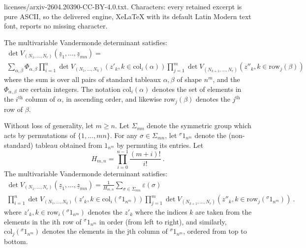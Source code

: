 \documentclass[10pt,a4paper]{amsart}
\newcommand{\z}{\underline{z}}
\begin{document}
licenses/arxiv-2604.20390-CC-BY-4.0.txt. Characters: every retained excerpt is pure ASCII, so the delivered engine, XeLaTeX with its default Latin Modern text font, reports no missing character.
\begin{thm} \label{thm: FirstVDMformula} The multivariable Vandermonde determinant satisfies:
\begin{multline}  \det V_{(N_1,\ldots, N_r)} (\z_1,\ldots , \z_{mn}) =   \label{Intro:FirstVDMformula} \\
 \sum_{\alpha,\beta}  \Phi_{\alpha,\beta} \prod_{i=1}^n  \det V_{(N_1,\ldots, N_k)} (z'_k, k\in \mathrm{col}_i(\alpha))  \prod_{j=1}^m  \det V_{(N_{k+1},\ldots, N_r)} (z''_k, k\in \mathrm{row}_j(\beta))   \end{multline}
 where the sum is over all pairs of standard tableaux $\alpha,\beta$ of shape $n^m$, and the $\Phi_{\alpha,\beta}$ are certain integers. The notation $\mathrm{col}_i(\alpha)$ denotes the set of elements in the $i^{\mathrm{th}}$ column of $\alpha$, in ascending order, and likewise $\mathrm{row}_j(\beta)$ denotes the $j^{\mathrm{th}}$ row of $\beta$.
 \end{thm} 

\begin{thm} \label{thm: SecondFormula} Without loss of generality, let $m\geq n$. Let $\Sigma_{mn}$ denote the symmetric group which acts by permutations of $\{1,\ldots, mn\}$.  For any $\sigma \in \Sigma_{mn}$,  let ${}^\sigma1_{n^m}$ denote the (non-standard) tableau obtained from $1_{n^m}$ by permuting its entries. Let 
\[ H_{m,n} =  \prod_{i=0}^{n-1}  \frac{(m+i)!}{i!}  \ .\]
The  multivariable Vandermonde determinant satisfies:
\begin{multline}  \det V_{(N_1,\ldots, N_r)} (\z_1,\ldots , \z_{mn}) =  \frac{1}{H_{m,n}}  \sum_{\sigma \in \Sigma_{mn}}  \varepsilon(\sigma)    \label{Intro:SecondVDMformula} \\
  \prod_{i=1}^n  \det V_{(N_1,\ldots, N_k)} (z'_k, k\in \mathrm{col}_i({}^\sigma1_{n^m}) )  \prod_{j=1}^m  \det V_{(N_{k+1},\ldots, N_r)} (z''_k, k\in \mathrm{row}_j({}^\sigma1_{n^m}))     \ . \end{multline}
  where $z'_k, k\in \mathrm{row}_i({}^\sigma1_{n^m}) $ denotes the $z'_k$ where the indices $k$ are taken from the elements in the ith row of ${}^\sigma1_{n^m}$ in  order (from left to right), and similarly, $\mathrm{col}_j({}^\sigma1_{n^m})$ denotes the elements in the jth column of ${}^\sigma1_{n^m}$, ordered from top to bottom.
\end{thm}
\end{document}
